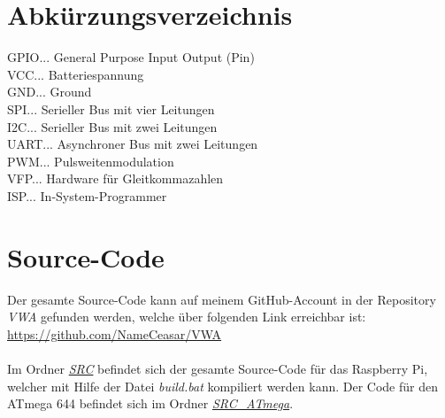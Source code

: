 \documentclass[12pt]{article}
\begin{document}
\section{Abkürzungsverzeichnis}
GPIO... General Purpose Input Output (Pin)\\
VCC... Batteriespannung\\
GND... Ground\\
SPI... Serieller Bus mit vier Leitungen\\
I2C... Serieller Bus mit zwei Leitungen\\
UART... Asynchroner Bus mit zwei Leitungen\\
PWM... Pulsweitenmodulation\\
VFP... Hardware für Gleitkommazahlen\\
ISP... In-System-Programmer
\newpage\section{Source-Code}
Der gesamte Source-Code kann auf meinem GitHub-Account in der Repository \textit{VWA} gefunden werden, welche über folgenden Link erreichbar ist:\\ \hyperlink{https://github.com/NameCeasar/VWA}{https://github.com/NameCeasar/VWA}\\\\
Im Ordner \hyperlink{https://github.com/NameCeasar/VWA/tree/master/SRC}{\textit{SRC}} befindet sich der gesamte Source-Code für das Raspberry Pi, welcher mit Hilfe der Datei \textit{build.bat} kompiliert werden kann. Der Code für den ATmega 644 befindet sich im Ordner \hyperlink{https://github.com/NameCeasar/VWA/tree/master/SRC_ATmega/VWA}{\textit{SRC\_ATmega}}.
\end{document}

